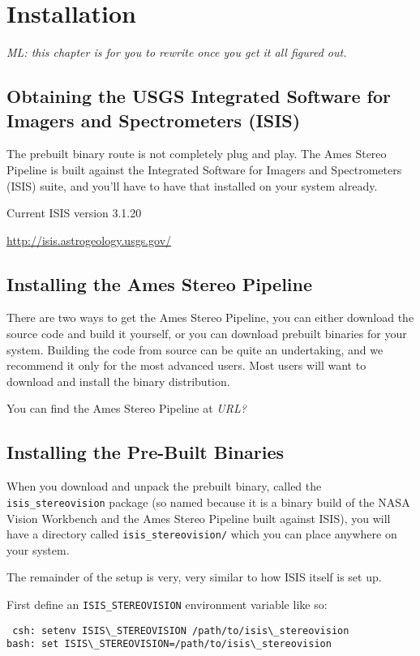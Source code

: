 \chapter{Installation}

\emph{ML: this chapter is for you to rewrite once you get it all figured out.}

\section{Obtaining the USGS Integrated Software for Imagers and Spectrometers (ISIS)}

The prebuilt binary route is not completely plug and play.  The
Ames Stereo Pipeline is built against the Integrated Software for
Imagers and Spectrometers (ISIS) suite, and you'll have to have
that installed on your system already.

Current ISIS version 3.1.20

\url{http://isis.astrogeology.usgs.gov/}

\section{Installing the Ames Stereo Pipeline}

There are two ways to get the Ames Stereo Pipeline, you can either
download the source code and build it yourself, or you can download
prebuilt binaries for your system.  Building the code from source can
be quite an undertaking, and we recommend it only for the most
advanced users.  Most users will want to download and install the
binary distribution.

You can find the Ames Stereo Pipeline at \emph{URL?}

\section{Installing the Pre-Built Binaries}

When you download and unpack the prebuilt binary, called the
\texttt{isis\_stereovision} package (so named because it is a binary
build of the NASA Vision Workbench and the Ames Stereo Pipeline
built against ISIS), you will have a directory called
\texttt{isis\_stereovision/} which you can place anywhere on your
system.

The remainder of the setup is very, very similar to how ISIS itself
is set up.

First define an \texttt{ISIS\_STEREOVISION} environment variable like so:
\begin{verbatim}
 csh: setenv ISIS\_STEREOVISION /path/to/isis\_stereovision
bash: set ISIS\_STEREOVISION=/path/to/isis\_stereovision
\end{verbatim}

